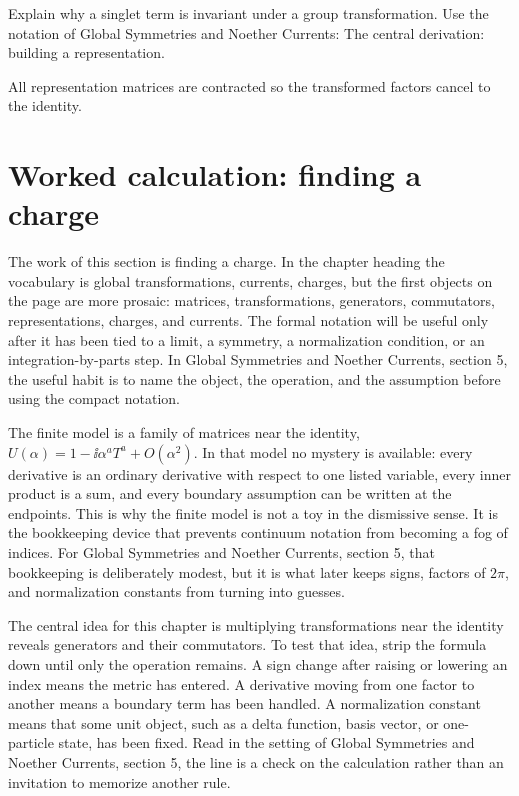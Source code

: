 \begin{exercise}
Explain why a singlet term is invariant under a group transformation.  Use the notation of Global Symmetries and Noether Currents: The central derivation: building a representation.
\begin{answer}
All representation matrices are contracted so the transformed factors cancel to the identity.
\end{answer}
\end{exercise}



\section{Worked calculation: finding a charge}

The work of this section is finding a charge.  In the chapter heading the vocabulary is global transformations, currents, charges, but the first objects on the page are more prosaic: matrices, transformations, generators, commutators, representations, charges, and currents.  The formal notation will be useful only after it has been tied to a limit, a symmetry, a normalization condition, or an integration-by-parts step.  In Global Symmetries and Noether Currents, section 5, the useful habit is to name the object, the operation, and the assumption before using the compact notation.

The finite model is a family of matrices near the identity, \(U(\alpha)=1-\ii\alpha^aT^a+O(\alpha^2)\).  In that model no mystery is available: every derivative is an ordinary derivative with respect to one listed variable, every inner product is a sum, and every boundary assumption can be written at the endpoints.  This is why the finite model is not a toy in the dismissive sense.  It is the bookkeeping device that prevents continuum notation from becoming a fog of indices.  For Global Symmetries and Noether Currents, section 5, that bookkeeping is deliberately modest, but it is what later keeps signs, factors of \(2\pi\), and normalization constants from turning into guesses.

The central idea for this chapter is multiplying transformations near the identity reveals generators and their commutators.  To test that idea, strip the formula down until only the operation remains.  A sign change after raising or lowering an index means the metric has entered.  A derivative moving from one factor to another means a boundary term has been handled.  A normalization constant means that some unit object, such as a delta function, basis vector, or one-particle state, has been fixed.  Read in the setting of Global Symmetries and Noether Currents, section 5, the line is a check on the calculation rather than an invitation to memorize another rule.

